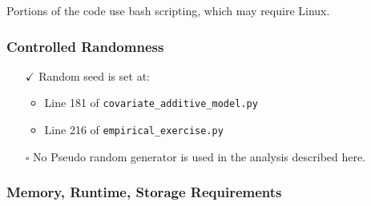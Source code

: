 \documentclass[10pt]{article}
\providecommand{\tightlist}{%
  \setlength{\itemsep}{0pt}\setlength{\parskip}{0pt}}
\begin{document}
Portions of the code use bash scripting, which may require Linux.


\hypertarget{controlled-randomness}{%
\subsubsection{Controlled Randomness}\label{controlled-randomness}}


\begin{itemize}
\tightlist
\item[$\checkmark$]
  Random seed is set at:
  \begin{itemize}
    \item Line 181 of \texttt{covariate\_additive\_model.py}
    \item Line 216 of \texttt{empirical\_exercise.py}
  \end{itemize}
\item[$\square$]
  No Pseudo random generator is used in the analysis described here.
\end{itemize}

\hypertarget{memory-runtime-storage-requirements}{%
\subsubsection{Memory, Runtime, Storage
Requirements}\label{memory-runtime-storage-requirements}}

\end{document}
